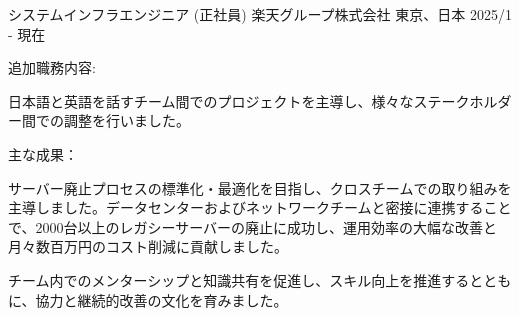 

\begin{cventries}
  \cventry
    {システムインフラエンジニア (正社員)} %
    {楽天グループ株式会社} %
    {東京、日本} %
    {2025/1 - 現在} %
    {
      追加職務内容:
      \begin{cvbullets}
        \item 日本語と英語を話すチーム間でのプロジェクトを主導し、様々なステークホルダー間での調整を行いました。
      \end{cvbullets}
      主な成果：
      \begin{cvbullets}
        \item サーバー廃止プロセスの標準化・最適化を目指し、クロスチームでの取り組みを主導しました。データセンターおよびネットワークチームと密接に連携することで、2000台以上のレガシーサーバーの廃止に成功し、運用効率の大幅な改善と月々数百万円のコスト削減に貢献しました。
        \item チーム内でのメンターシップと知識共有を促進し、スキル向上を推進するとともに、協力と継続的改善の文化を育みました。
      \end{cvbullets}
    }


\end{cventries}
